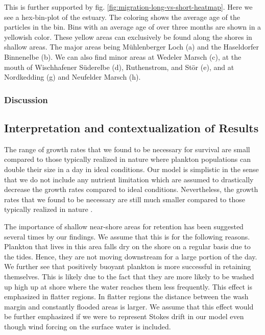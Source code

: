 \documentclass[npg, manuscript]{copernicus}
\begin{document}
This is further supported by fig. \ref{fig:migration-long-vs-short-heatmap}.
Here we see a hex-bin-plot of the estuary. The coloring shows the average age of the particles in the bin.
Bins with an average age of over three months are shown in a yellowish color.
These yellow areas can exclusively be found along the shores in shallow areas.
The major areas being Mühlenberger Loch (a) and the Haseldorfer Binnenelbe (b). We can also find minor areas at Wedeler Marsch (c), at the mouth of Wischhafener Süderelbe (d), Ruthenstrom, and Stör (e), and at Nordkedding (g) and Neufelder Marsch (h).




\subsubsection{Discussion}

\subsection{Interpretation and contextualization of Results}

The range of growth rates that we found to be necessary for survival are small compared to those typically realized in nature where plankton populations can double their size in a day in ideal conditions.
Our model is simplistic in the sense that we do not include any nutrient limitation which are assumed to drastically decrease the growth rates compared to ideal conditions. 
Nevertheless, the growth rates that we found to be necessary are still much smaller compared to those typically realized in nature \citep{Koch2004}.

The importance of shallow near-shore areas for retention has been suggested several times by our findings. 
We assume that this is for the following reasons.
Plankton that lives in this area falls dry on the shore on a regular basis due to the tides. Hence, they are not moving downstream for a large portion of the day.
We further see that positively buoyant plankton is more successful in retaining themselves. 
This is likely due to the fact that they are more likely to be washed up high up at shore where the water reaches them less frequently.
This effect is emphasized in flatter regions.
In flatter regions the distance between the wash margin and constantly flooded areas is larger. 
We assume that this effect would be further emphasized if we were to represent Stokes drift in our model even though wind forcing on the surface water is included.
\end{document}

